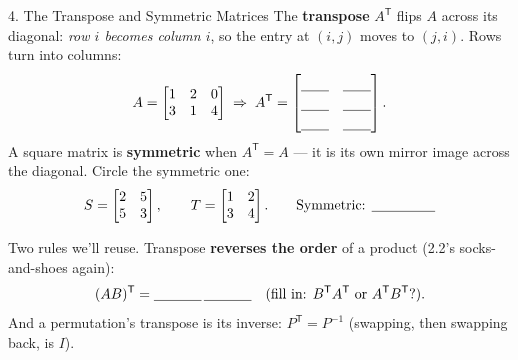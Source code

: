 \documentclass[10pt]{article}
\newcommand{\PP}{P}
\newcommand{\tp}{\mathsf{T}}
\begin{document}
\begin{notesbox}{4. The Transpose and Symmetric Matrices}
The \textbf{transpose} $A^{\tp}$ flips $A$ across its diagonal: \emph{row $i$ becomes column $i$}, so the
entry at $(i,j)$ moves to $(j,i)$. Rows turn into columns:
\[
  A = \begin{bmatrix} 1 & 2 & 0 \\ 3 & 1 & 4 \end{bmatrix}
  \;\Rightarrow\;
  A^{\tp} = \begin{bmatrix}\rule{0pt}{1.1em}\blank{0.7cm} & \blank{0.7cm}\\[2pt] \blank{0.7cm} & \blank{0.7cm}\\[2pt] \blank{0.7cm} & \blank{0.7cm}\end{bmatrix}.
\]
A square matrix is \textbf{symmetric} when $A^{\tp}=A$ --- it is its own mirror image across the
diagonal. Circle the symmetric one:
\[
  S = \begin{bmatrix} 2 & 5 \\ 5 & 3 \end{bmatrix}, \qquad
  T = \begin{bmatrix} 1 & 2 \\ 3 & 4 \end{bmatrix}.
  \qquad\text{Symmetric: } \blank{1.6cm}
\]

\vspace{2pt}
Two rules we'll reuse. Transpose \textbf{reverses the order} of a product (2.2's socks-and-shoes again):
\[
  (AB)^{\tp} = \blank{1.2cm}\,\blank{1.2cm}\quad\text{(fill in: } B^{\tp}A^{\tp}\text{ or } A^{\tp}B^{\tp}?\text{)}.
\]
And a permutation's transpose is its inverse: $\PP^{\tp}=\PP^{-1}$ (swapping, then swapping back, is $I$).
\end{notesbox}
\end{document}
